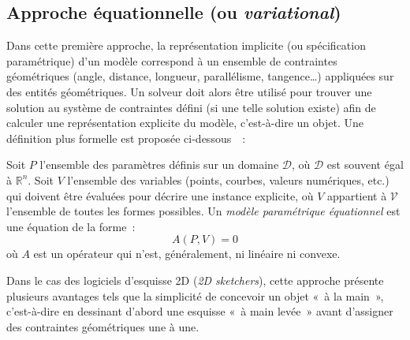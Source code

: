 \subsection{Approche équationnelle (ou \textit{variational})}
\label{sec:etat-art-modelisation-parametric-approche-equationnelle}

Dans cette première approche, la représentation implicite (ou spécification
paramétrique) d'un modèle correspond à un ensemble de contraintes géométriques
(angle, distance, longueur, parallélisme, tangence\dots) appliquées sur des
entités géométriques. %
Un solveur doit alors être utilisé pour trouver une solution au système de
contraintes défini (si une telle solution existe) afin de calculer une
représentation explicite du modèle, c'est-à-dire un objet. %
Une définition plus formelle est proposée
ci-dessous~\cite{pierra1996general}~: %
\begin{definition}
	Soit $P$ l'ensemble des paramètres définis sur un domaine $\mathcal{D}$, où
	$\mathcal{D}$ est souvent égal à $\mathbb{R}^{n}$. %
	Soit $V$ l'ensemble des variables (points, courbes, valeurs numériques, etc.) qui doivent être évaluées pour décrire une instance explicite, où $V$ appartient à $\mathcal{V}$ l'ensemble de toutes les formes possibles. Un \emph{modèle paramétrique équationnel} est une équation de la forme~:
	\[ A(P,V) = 0 \] %
	où $A$ est un opérateur qui	n'est, généralement, ni linéaire ni convexe. %
\end{definition}

Dans le cas des logiciels d'esquisse 2D (\textit{2D sketchers}), cette approche
présente plusieurs avantages tels que la simplicité de concevoir un objet «~à la
main~», c'est-à-dire en dessinant d'abord une esquisse «~à main levée~» avant
d'assigner des contraintes géométriques une à une. %

